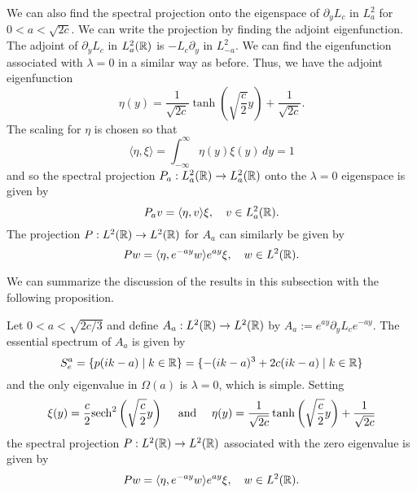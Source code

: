 We can also find the spectral projection onto the eigenspace of \(\partial_y L_c\) in \(L^2_a\) for \(0< a< \sqrt{2c}\). We can write the projection by finding the adjoint eigenfunction. The adjoint of \(\partial_y L_c\) in \(L^2_a(\mathbb{R})\) is \(-L_c\partial_y\) in \(L^2_{-a}\). We can find the eigenfunction associated with \(\lambda = 0\) in a similar way as before. Thus, we have the adjoint eigenfunction
\begin{equation*} 
	\eta(y) = \frac{1}{\sqrt{2c}} \tanh\left(\sqrt{\frac c 2 } y\right) + \frac{1}{\sqrt{2c}}.
\end{equation*} 
The scaling for \(\eta\) is chosen so that
\begin{equation*} 
	\langle \eta, \xi \rangle = \int_{-\infty}^\infty \eta(y) \xi(y) \, d y = 1
\end{equation*} 
and so the spectral projection \(P_a : L^2_a(\mathbb{R}) \to L_a^2(\mathbb{R})\) onto the \(\lambda = 0\) eigenspace is given by
\begin{equation*} 
	P_av = \langle \eta, v \rangle \xi, \quad v\in L^2_a(\mathbb{R}).
\end{equation*} 
The projection \(P:L^2(\mathbb{R}) \to L^2(\mathbb{R})\) for \(A_a\) can similarly be given by
\begin{equation}\label{spectral-projector}
	P w = \langle \eta, e^{-ay} w \rangle e^{ay} \xi, \quad w\in L^2(\mathbb{R}).
\end{equation}

We can summarize the discussion of the results in this subsection with the following proposition.
\begin{prop}
	Let \(0< a< \sqrt{2c/3}\) and define \(A_a :L^2(\mathbb{R}) \to L^2(\mathbb{R})\) by \(A_a := e^{ay} \partial_y L_c e^{-ay}.\) The essential spectrum of \(A_a\) is given by
	\begin{equation*} 
		S^a_e = \{p(ik - a) \mid k \in \mathbb{R}\}= \{ - (ik - a)^3 + 2c(ik - a) \mid k \in \mathbb{R}\}
	\end{equation*} 
	and the only eigenvalue in \(\Omega(a)\) is \(\lambda = 0\), which is simple. Setting
	\begin{equation*} 
		\xi(y) = \frac c 2 \mathrm{sech}^2\left( \sqrt{\frac c 2} y \right) \quad \text{ and } \quad \eta(y) = \frac{1}{\sqrt{2c}} \tanh\left(\sqrt{\frac c 2 } y\right) + \frac{1}{\sqrt{2c}}
	\end{equation*} 
	the spectral projection \(P:L^2(\mathbb{R}) \to L^2(\mathbb{R})\) associated with the zero eigenvalue is given by
	\begin{equation*} 
		P w = \langle \eta, e^{-ay} w \rangle e^{ay} \xi, \quad w \in L^2(\mathbb{R}).
	\end{equation*} 
\end{prop}

